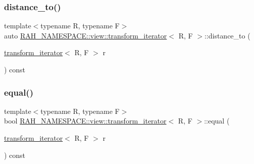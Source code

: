 \mbox{\label{struct_r_a_h___n_a_m_e_s_p_a_c_e_1_1view_1_1transform__iterator_abb46d19168d30284cd232094a219f432}} 
\subsubsection{\texorpdfstring{distance\_to()}{distance\_to()}}
{\footnotesize\ttfamily template$<$typename R, typename F$>$ \\
auto \mbox{\hyperlink{struct_r_a_h___n_a_m_e_s_p_a_c_e_1_1view_1_1transform__iterator}{R\+A\+H\+\_\+\+N\+A\+M\+E\+S\+P\+A\+C\+E\+::view\+::transform\+\_\+iterator}}$<$ R, F $>$\+::distance\+\_\+to (\begin{DoxyParamCaption}\item[{\mbox{\hyperlink{struct_r_a_h___n_a_m_e_s_p_a_c_e_1_1view_1_1transform__iterator}{transform\+\_\+iterator}}$<$ R, F $>$}]{r }\end{DoxyParamCaption}) const\hspace{0.3cm}{\ttfamily [inline]}}

\mbox{\label{struct_r_a_h___n_a_m_e_s_p_a_c_e_1_1view_1_1transform__iterator_a7f9d61a4a68fa70f51253066c7fe9321}} 
\subsubsection{\texorpdfstring{equal()}{equal()}}
{\footnotesize\ttfamily template$<$typename R, typename F$>$ \\
bool \mbox{\hyperlink{struct_r_a_h___n_a_m_e_s_p_a_c_e_1_1view_1_1transform__iterator}{R\+A\+H\+\_\+\+N\+A\+M\+E\+S\+P\+A\+C\+E\+::view\+::transform\+\_\+iterator}}$<$ R, F $>$\+::equal (\begin{DoxyParamCaption}\item[{\mbox{\hyperlink{struct_r_a_h___n_a_m_e_s_p_a_c_e_1_1view_1_1transform__iterator}{transform\+\_\+iterator}}$<$ R, F $>$}]{r }\end{DoxyParamCaption}) const\hspace{0.3cm}{\ttfamily [inline]}}

